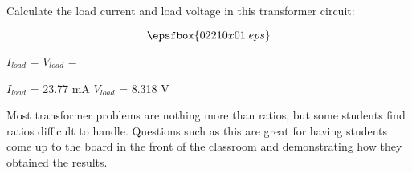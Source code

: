

Calculate the load current and load voltage in this transformer circuit:

$$\epsfbox{02210x01.eps}$$

$I_{load}$ = \hskip 80pt $V_{load}$ =

\vskip 10pt







$I_{load}$ = 23.77 mA \hskip 80pt $V_{load}$ = 8.318 V







Most transformer problems are nothing more than ratios, but some students find ratios difficult to handle.  Questions such as this are great for having students come up to the board in the front of the classroom and demonstrating how they obtained the results.




